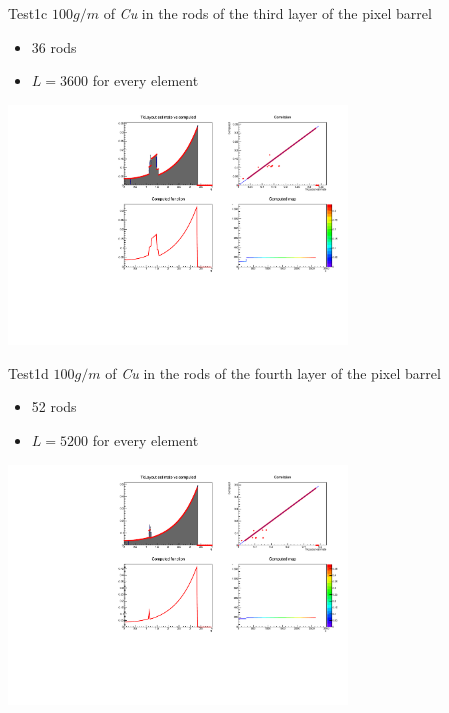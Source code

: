 \documentclass[pdftex, 11pt]{beamer}
\begin{document}
\begin{frame}
  \begin{block}{Test1c}
    \alert{$100 g/m$} of \emph{Cu}  in the rods of the third layer of the pixel barrel
    \begin{itemize}
    \item \alert{36} rods
    \item \alert{$L=3600$} for every element
    \end{itemize}
  \end{block}
  \begin{center}
    \includegraphics[width=9cm]{img/test1c.pdf}
  \end{center}
\end{frame}

\begin{frame}
  \begin{block}{Test1d}
    \alert{$100 g/m$} of \emph{Cu}  in the rods of the fourth layer of the pixel barrel
    \begin{itemize}
    \item \alert{52} rods
    \item \alert{$L=5200$} for every element
    \end{itemize}
  \end{block}
  \begin{center}
    \includegraphics[width=9cm]{img/test1d.pdf}
  \end{center}
\end{frame}
\end{document}
